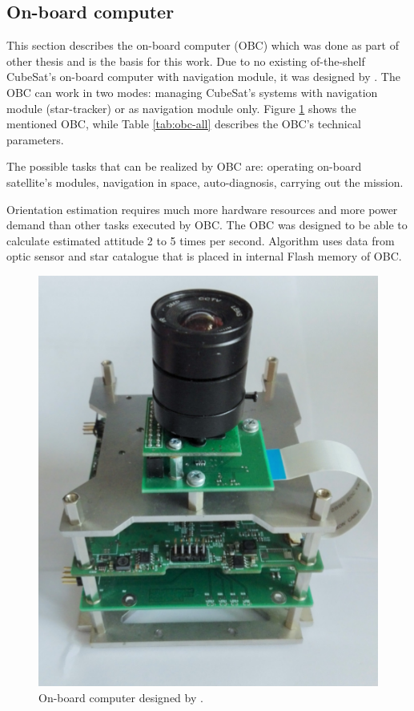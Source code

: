 \documentclass[12pt,a4paper,oneside]{article}
\begin{document}
\subsection{On-board computer}
This section describes the on-board computer (OBC) which was done as part of other thesis and is the basis for this work. Due to no existing of-the-shelf CubeSat's on-board computer with navigation module, it was designed by \citet{gaska2016obc}. The OBC can work in two modes: managing CubeSat's systems with navigation module (star-tracker) or as navigation module only. Figure \ref{fig:obc-photo} shows the mentioned OBC, while Table \ref{tab:obc-all} describes the OBC's technical parameters.

The possible tasks that can be realized by OBC are: operating on-board satellite's modules, navigation in space, auto-diagnosis, carrying out the mission.

Orientation estimation requires much more hardware resources and more power demand than other tasks executed by OBC. The OBC was designed to be able to calculate estimated attitude 2 to 5 times per second. Algorithm uses data from optic sensor and star catalogue that is placed in internal Flash memory of OBC.

\begin{figure}[!htbp]
\includegraphics[scale=0.45]{obc_photo.png}
\centering
\caption{On-board computer designed by \citet{gaska2016obc}.}
\label{fig:obc-photo}
\end{figure}
\end{document}
